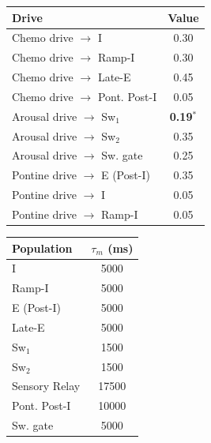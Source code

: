 \documentclass[pdflatex,sn-mathphys-ay]{sn-jnl}%
\theoremstyle{thmstyleone}%
\theoremstyle{thmstyletwo}%
\theoremstyle{thmstylethree}%
\begin{document}
\begin{center}

\begin{tabular}{lc}\hline
Drive & Value\\ \hline
Chemo drive $\to$ I & 0.30\\
Chemo drive $\to$ Ramp-I & 0.30\\
Chemo drive $\to$ Late-E & 0.45\\
Chemo drive $\to$ Pont. Post-I & 0.05\\
Arousal drive $\to$ Sw$_1$ & \textbf{0.19}$^{*}$\\
Arousal drive $\to$ Sw$_2$ & 0.35\\
Arousal drive $\to$ Sw. gate & 0.25\\
Pontine drive $\to$ E (Post-I) & 0.35\\
Pontine drive $\to$ I & 0.05\\
Pontine drive $\to$ Ramp-I & 0.05\\ \hline
\end{tabular}
\footnotesize 
\end{center}
\label{tbl: drives}

\begin{center}
\begin{tabular}{lc}\hline
Population & $\tau_m$ (ms) \\ \hline
I & 5000 \\
Ramp-I & 5000 \\
E (Post-I) & 5000 \\
Late-E & 5000 \\
Sw$_1$ & 1500 \\
Sw$_2$ & 1500 \\
Sensory Relay & 17500 \\
Pont. Post-I & 10000 \\
Sw. gate & 5000 \\ \hline
\end{tabular}
\label{tbl: intrinsic_params}
\end{center}


\end{document}
